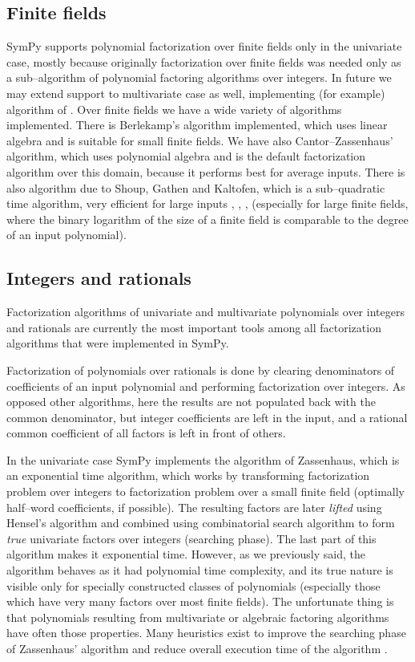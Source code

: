\subsection{Finite fields}

SymPy supports polynomial factorization over finite fields only in the univariate case, mostly because
originally factorization over finite fields was needed only as a sub--algorithm of polynomial factoring
algorithms over integers. In future we may extend support to multivariate case as well, implementing (for
example) algorithm of \cite{Gathen1983polytime}. Over finite fields we have a wide variety of algorithms
implemented. There is Berlekamp's algorithm implemented, which uses linear algebra and is suitable for
small finite fields. We have also Cantor--Zassenhaus' algorithm, which uses polynomial algebra and is
the default factorization algorithm over this domain, because it performs best for average inputs. There
is also algorithm due to Shoup, Gathen and Kaltofen, which is a sub--quadratic time algorithm, very
efficient for large inputs \cite{Gathen1992frobenious}, \cite{Shoup1993reality}, \cite{Kaltofen1995subquadratic},
\cite{Shoup1995factor} (especially for large finite fields, where the binary logarithm of the size of a
finite field is comparable to the degree of an input polynomial).


\subsection{Integers and rationals}

Factorization algorithms of univariate and multivariate polynomials over integers and rationals are
currently the most important tools among all factorization algorithms that were implemented in SymPy.

Factorization of polynomials over rationals is done by clearing denominators of coefficients of an input
polynomial and performing factorization over integers. As opposed other algorithms, here the results are
not populated back with the common denominator, but integer coefficients are left in the input, and a
rational common coefficient of all factors is left in front of others.

In the univariate case SymPy implements the algorithm of Zassenhaus, which is an exponential time
algorithm, which works by transforming factorization problem over integers to factorization problem
over a small finite field (optimally half--word coefficients, if possible). The resulting factors
are later \emph{lifted} using Hensel's algorithm and combined using combinatorial search algorithm to
form \emph{true} univariate factors over integers (searching phase). The
last part of this algorithm makes it exponential time. However, as we previously said, the algorithm
behaves as it had polynomial time complexity, and its true nature is visible only for specially
constructed classes of polynomials (especially those which have very many factors over most finite
fields). The unfortunate thing is that polynomials resulting from multivariate or algebraic factoring
algorithms have often those properties. Many heuristics exist to improve the searching phase of
Zassenhaus' algorithm and reduce overall execution time of the algorithm \cite{Abbott2000searching}.

